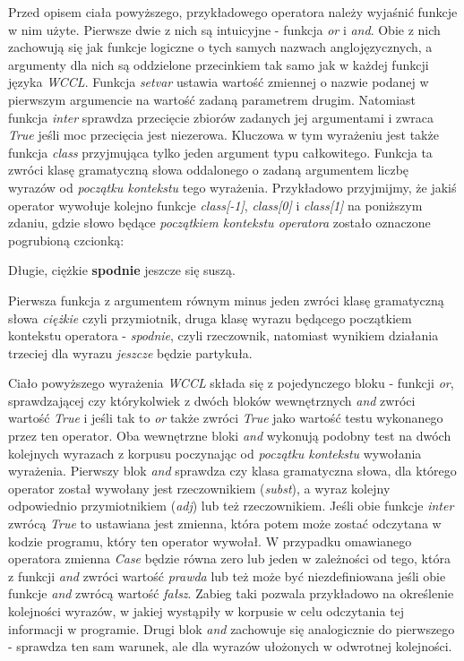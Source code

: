 \documentclass[11pt,a4paper]{llncs}
\begin{document}
Przed opisem ciała powyższego, przykładowego operatora należy wyjaśnić funkcje w nim użyte.
Pierwsze dwie z nich są intuicyjne - funkcja \emph{or} i \emph{and}.
Obie z nich zachowują się jak funkcje logiczne o tych samych nazwach anglojęzycznych, a argumenty dla nich są oddzielone przecinkiem tak samo jak w każdej funkcji języka \emph{WCCL}.
Funkcja \emph{setvar} ustawia wartość zmiennej o nazwie podanej w pierwszym argumencie na wartość zadaną parametrem drugim.
Natomiast funkcja \emph{inter} sprawdza przecięcie zbiorów zadanych jej argumentami i zwraca \emph{True} jeśli moc przecięcia jest niezerowa.
Kluczowa w tym wyrażeniu jest także funkcja \emph{class} przyjmująca tylko jeden argument typu całkowitego.
Funkcja ta zwróci klasę gramatyczną słowa oddalonego o zadaną argumentem liczbę wyrazów od \emph{początku kontekstu} tego wyrażenia.
Przykładowo przyjmijmy, że jakiś operator wywołuje kolejno funkcje \emph{class[-1]}, \emph{class[0]} i \emph{class[1]} na poniższym zdaniu, gdzie słowo będące \emph{początkiem kontekstu operatora} zostało oznaczone pogrubioną czcionką:
\begin{center}
Długie, ciężkie \textbf{spodnie} jeszcze się suszą.
\end{center}
Pierwsza funkcja z argumentem równym minus jeden zwróci klasę gramatyczną słowa \emph{ciężkie} czyli przymiotnik, druga klasę wyrazu będącego początkiem kontekstu operatora - \emph{spodnie}, czyli rzeczownik, natomiast wynikiem działania trzeciej dla wyrazu \emph{jeszcze} będzie partykuła.



Ciało powyższego wyrażenia \emph{WCCL} składa się z pojedynczego bloku - funkcji \emph{or}, sprawdzającej czy którykolwiek z dwóch bloków wewnętrznych \emph{and} zwróci wartość \emph{True} i jeśli tak to \emph{or} także zwróci \emph{True} jako wartość testu wykonanego przez ten operator.
Oba wewnętrzne bloki \emph{and} wykonują podobny test na dwóch kolejnych wyrazach z korpusu poczynając od \emph{początku kontekstu} wywołania wyrażenia.
Pierwszy blok \emph{and} sprawdza czy klasa gramatyczna słowa, dla którego operator został wywołany jest rzeczownikiem (\emph{subst}), a wyraz kolejny odpowiednio przymiotnikiem (\emph{adj}) lub też rzeczownikiem.
Jeśli obie funkcje \emph{inter} zwrócą \emph{True} to ustawiana jest zmienna, która potem może zostać odczytana w kodzie programu, który ten operator wywołał.
W przypadku omawianego operatora zmienna \emph{Case} będzie równa zero lub jeden w zależności od tego, która z funkcji \emph{and} zwróci wartość \emph{prawda} lub też może być niezdefiniowana jeśli obie funkcje \emph{and} zwrócą wartość \emph{fałsz}.
Zabieg taki pozwala przykładowo na określenie kolejności wyrazów, w jakiej wystąpiły w korpusie w celu odczytania tej informacji w programie.
Drugi blok \emph{and} zachowuje się analogicznie do pierwszego - sprawdza ten sam warunek, ale dla wyrazów ułożonych w odwrotnej kolejności.
\end{document}
